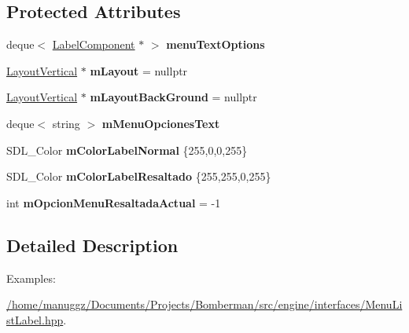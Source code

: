 \subsection*{Protected Attributes}
\begin{DoxyCompactItemize}
\item 
deque$<$ \hyperlink{class_label_component}{Label\+Component} $\ast$ $>$ {\bfseries menu\+Text\+Options}\hypertarget{class_menu_list_label_a4d0a9e5581aa3ebf2d6d5599fdb2dfed}{}\label{class_menu_list_label_a4d0a9e5581aa3ebf2d6d5599fdb2dfed}

\item 
\hyperlink{class_layout_vertical}{Layout\+Vertical} $\ast$ {\bfseries m\+Layout} = nullptr\hypertarget{class_menu_list_label_a78112edcf4dccb025b60192373bc5b8e}{}\label{class_menu_list_label_a78112edcf4dccb025b60192373bc5b8e}

\item 
\hyperlink{class_layout_vertical}{Layout\+Vertical} $\ast$ {\bfseries m\+Layout\+Back\+Ground} = nullptr\hypertarget{class_menu_list_label_a00a12da8ca12067b9e46ee47df4ddb37}{}\label{class_menu_list_label_a00a12da8ca12067b9e46ee47df4ddb37}

\item 
deque$<$ string $>$ {\bfseries m\+Menu\+Opciones\+Text}\hypertarget{class_menu_list_label_a8069cc9a24b9151931c6d7ceb5774c59}{}\label{class_menu_list_label_a8069cc9a24b9151931c6d7ceb5774c59}

\item 
S\+D\+L\+\_\+\+Color {\bfseries m\+Color\+Label\+Normal} \{255,0,0,255\}\hypertarget{class_menu_list_label_a60ca7a85009c7c1eaee487a949db8ff8}{}\label{class_menu_list_label_a60ca7a85009c7c1eaee487a949db8ff8}

\item 
S\+D\+L\+\_\+\+Color {\bfseries m\+Color\+Label\+Resaltado} \{255,255,0,255\}\hypertarget{class_menu_list_label_a75f5e912229d412283d2e8b47b6c658a}{}\label{class_menu_list_label_a75f5e912229d412283d2e8b47b6c658a}

\item 
int {\bfseries m\+Opcion\+Menu\+Resaltada\+Actual} = -\/1\hypertarget{class_menu_list_label_a5ae196badf289099b400dad5a89eaa34}{}\label{class_menu_list_label_a5ae196badf289099b400dad5a89eaa34}

\end{DoxyCompactItemize}


\subsection{Detailed Description}
\begin{Desc}
\item[Examples\+: ]\par
\hyperlink{_2home_2manuggz_2_documents_2_projects_2_bomberman_2src_2engine_2interfaces_2_menu_list_label_8hpp-example}{/home/manuggz/\+Documents/\+Projects/\+Bomberman/src/engine/interfaces/\+Menu\+List\+Label.\+hpp}.\end{Desc}


